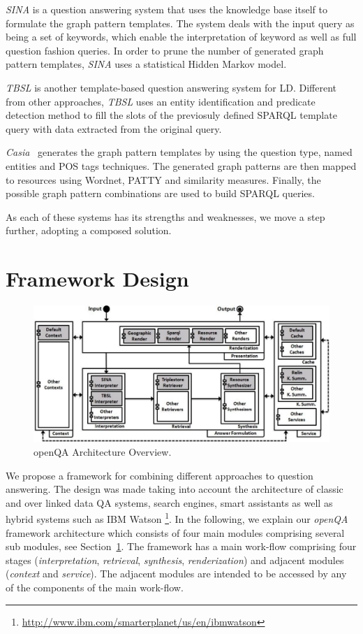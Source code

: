 \emph{SINA} is a question answering system that uses the knowledge base itself to formulate the graph pattern templates.
The system deals with the input query as being a set of keywords, which enable the interpretation of keyword as well as full question fashion queries.
In order to prune the number of generated graph pattern templates, \emph{SINA} uses a statistical Hidden Markov model.

\emph{TBSL} is another template-based question answering system for LD.
Different from other approaches, \emph{TBSL} uses an entity identification and predicate detection method to fill the slots of the previosuly defined SPARQL template query with data extracted from the original query.

\emph{Casia}~\cite{clef2013casia} generates the graph pattern templates by using the question type, named entities and POS tags techniques.
The generated graph patterns are then mapped to resources using Wordnet, PATTY and similarity measures.
Finally, the possible graph pattern combinations are used to build SPARQL queries.

As each of these systems has its strengths and weaknesses, we move a step further, adopting a composed solution.

\section{Framework Design}
\label{chaopenqa:sec:design}

\begin{figure}[bht]
	\centering
	\includegraphics[width=.97\textwidth]{chapter_four/SEMANTiCS_openQA/images/architecture.pdf}
	\caption{openQA Architecture Overview.}
	\label{chaopenqa:fig:architecture}
	\vspace{-4.0mm}
\end{figure}
We propose a framework for combining different approaches to question answering.
The design was made taking into account the architecture of classic and over linked data QA systems, search engines, smart assistants as well as hybrid systems such as IBM Watson \footnote{\url{http://www.ibm.com/smarterplanet/us/en/ibmwatson}}.
In the following, we explain our \emph{openQA} framework architecture which consists of four main modules comprising several sub modules, see Section~\ref{chaopenqa:fig:architecture}.
The framework has a main work-flow comprising four stages (\emph{interpretation}, \emph{retrieval}, \emph{synthesis},  %
\emph{renderization}) and adjacent modules (\emph{context} and \emph{service}).
The adjacent modules are intended to be accessed by any of the components of the main work-flow.

